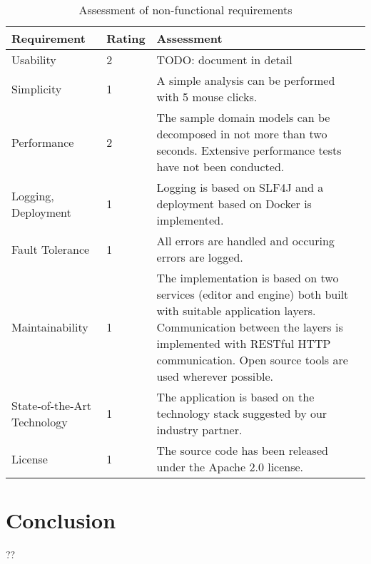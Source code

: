 \begin{table}[H]
	\centering
	\caption{Assessment of non-functional requirements}
	\label{tab:conclusionNonFunctional}
	\begin{tabular}{|p{100pt}|l|p{250pt}|}
	\hline \textbf{Requirement} & \textbf{Rating} & \textbf{Assessment} \\ 
	\hline Usability & 2 & TODO: document in detail \\ %
	\hline Simplicity & 1 & A simple analysis can be performed with 5 mouse clicks. \\
	\hline Performance & 2 & The sample domain models can be decomposed in not more than two seconds. Extensive performance tests have not been conducted. \\ %
	\hline Logging, \newline Deployment & 1 & Logging is based on SLF4J and a deployment based on Docker is implemented. \\
	\hline Fault Tolerance & 1 & All errors are handled and occuring errors are logged. \\
	\hline Maintainability & 1 & The implementation is based on two services (editor and engine) both built with suitable application layers. Communication between the layers is implemented with RESTful HTTP communication. Open source tools are used wherever possible. \\
	\hline State-of-the-Art Technology & 1 & The application is based on the technology stack suggested by our industry partner. \\
	\hline License & 1 & The source code has been released under the Apache 2.0 license. \\
	\hline 
	\end{tabular} 
\end{table}


\chapter{Conclusion}

??


